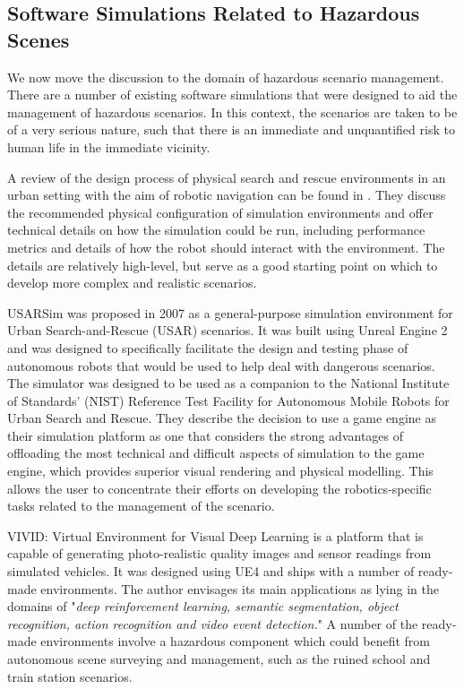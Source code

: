\subsection{Software Simulations Related to Hazardous Scenes}
We now move the discussion to the domain of hazardous scenario management. There are a number of existing software simulations that were designed to aid the management of hazardous scenarios. In this context, the scenarios are taken to be of a very serious nature, such that there is an immediate and unquantified risk to human life in the immediate vicinity.

\par A review of the design process of physical search and rescue environments in an urban setting with the aim of robotic navigation can be found in \cite{Jacoff2003TestRobots}. They discuss the recommended physical configuration of simulation environments and offer technical details on how the simulation could be run, including performance metrics and details of how the robot should interact with the environment. The details are relatively high-level, but serve as a good starting point on which to develop more complex and realistic scenarios.

USARSim \cite{Carpin2007USARSim:Education} was proposed in 2007 as a general-purpose simulation environment for Urban Search-and-Rescue (USAR) scenarios. It was built using Unreal Engine 2 and was designed to specifically facilitate the design and testing phase of autonomous robots that would be used to help deal with dangerous scenarios. The simulator was designed to be used as a companion to the National Institute of Standards’ (NIST) Reference Test Facility for Autonomous Mobile Robots for Urban Search and Rescue. They describe the decision to use a game engine as their simulation platform as one that considers the strong advantages of offloading the most technical and difficult aspects of simulation to the game engine, which provides superior visual rendering and physical modelling. This allows the user to concentrate their efforts on developing the robotics-specific tasks related to the management of the scenario.\par


VIVID: Virtual Environment for Visual Deep Learning \cite{Lai2018ViviD:Learning} is a platform that is capable of generating photo-realistic quality images and sensor readings from simulated vehicles. It was designed using UE4 and ships with a number of ready-made environments. The author envisages its main applications as lying in the domains of "\textit{deep reinforcement learning, semantic segmentation, object recognition, action recognition and video event detection.}" A number of the ready-made environments involve a hazardous component which could benefit from autonomous scene surveying and management, such as the ruined school and train station scenarios.



